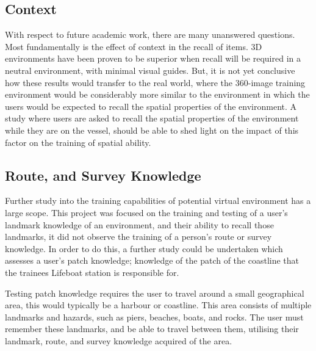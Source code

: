 \documentclass[ %
                    author={Elis Jones},
                supervisor={Dr. Kirsten Cater},
                    degree={BSc},
                     title={The Effect of Presentation Medium on Spatial Cognition},
                  subtitle={in the Virtual Environment},
                      year={2018} ]{dissertation}
\begin{document}
\subsection{Context}\label{further-context}
With respect to future academic work, there are many unanswered questions. Most fundamentally is the effect of context in the recall of items. 3D environments have been proven to be superior when recall will be required in a neutral environment, with minimal visual guides. But, it is not yet conclusive how these results would transfer to the real world, where the 360-image training environment would be considerably more similar to the environment in which the users would be expected to recall the spatial properties of the environment. A study where users are asked to recall the spatial properties of the environment while they are on the vessel, should be able to shed light on the impact of this factor on the training of spatial ability. 

\subsection{Route, and Survey Knowledge}
Further study into the training capabilities of potential virtual environment has a large scope. This project was focused on the training and testing of a user's landmark knowledge of an environment, and their ability to recall those landmarks, it did not observe the training of a person's route or survey knowledge. In order to do this, a further study could be undertaken which assesses a user's patch knowledge; knowledge of the patch of the coastline that the trainees Lifeboat station is responsible for.

Testing patch knowledge requires the user to travel around a small geographical area, this would typically be a harbour or coastline. This area consists of multiple landmarks and hazards, such as piers, beaches, boats, and rocks. The user must remember these landmarks, and be able to travel between them, utilising their landmark, route, and survey knowledge acquired of the area. 



\clearpage


\end{document}
